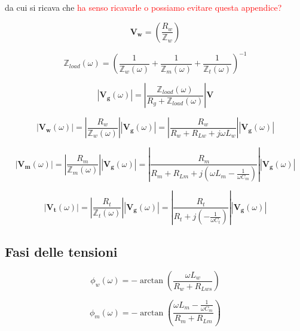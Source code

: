 \documentclass[12pt,italian]{article}
\newcommand{\err}[1]{\textcolor{red}{#1}}
\begin{document}
\noindent
da cui si ricava che \err{ha senso ricavarle o possiamo evitare questa appendice?}

\begin{equation}
	\mathbf{V_{w}} = \left( \frac{R_{w}}{\mathbb{Z}_{w}} \right)
\end{equation}

\begin{equation*}
	\mathbb{Z}_{load}(\omega) = \left(\frac{1}{\mathbb{Z}_{w}(\omega)} + \frac{1}{\mathbb{Z}_{m}(\omega)} + \frac{1}{\mathbb{Z}_{t}(\omega)}\right)^{-1}
\end{equation*}

\begin{equation}
	\left| \mathbf{V_{g}}(\omega) \right| = \left| \frac{\mathbb{Z}_{load}(\omega)}
	{R_{g}+\mathbb{Z}_{load}(\omega)}\right| \mathbf{V}
\end{equation}

\begin{equation}
	\left| \mathbf{V_{w}}(\omega) \right| = \left| \frac{R_{w}}
	{\mathbb{Z}_{w}(\omega)}\right|\left| \mathbf{V_{g}}(\omega) \right| = \left| \frac{R_{w}}
	{R_{w}+R_{Lw} + j \omega L_w}\right|\left| \mathbf{V_{g}}(\omega) \right|
\end{equation}

\begin{equation}
	\left| \mathbf{V_{m}}(\omega) \right| = \left| \frac{R_{m}}
	{\mathbb{Z}_{m}(\omega)}\right|\left| \mathbf{V_{g}}(\omega) \right| = \left| \frac{R_{m}}{R_{m}+R_{Lm} + j (\omega L_m - \frac{1}{\omega C_{m}})} \right| \left| \mathbf{V_{g}}(\omega) \right|
\end{equation}

\begin{equation}
	\left| \mathbf{V_{t}}(\omega) \right| = \left| \frac{R_{t}}
	{\mathbb{Z}_{t}(\omega)}\right|\left| \mathbf{V_{g}}(\omega) \right| = \left| \frac{R_{t}}{R_{t} + j (-\frac{1}{\omega C_{t}})}\right|\left| \mathbf{V_{g}}(\omega) \right|
\end{equation}

\subsection{Fasi delle tensioni}
\label{sec:fasi}

\begin{equation}
	\phi_{w}(\omega) = - \arctan\left(\frac{\omega L_{w}}{R_{w}+R_{Lws}}\right)
\end{equation}

\begin{equation}
	\phi_{m}(\omega) = - \arctan\left(\frac{\omega L_{m} - \frac{1}{\omega C_{m}}}{R_{m}+R_{Lm}}\right)
\end{equation}
\end{document}
